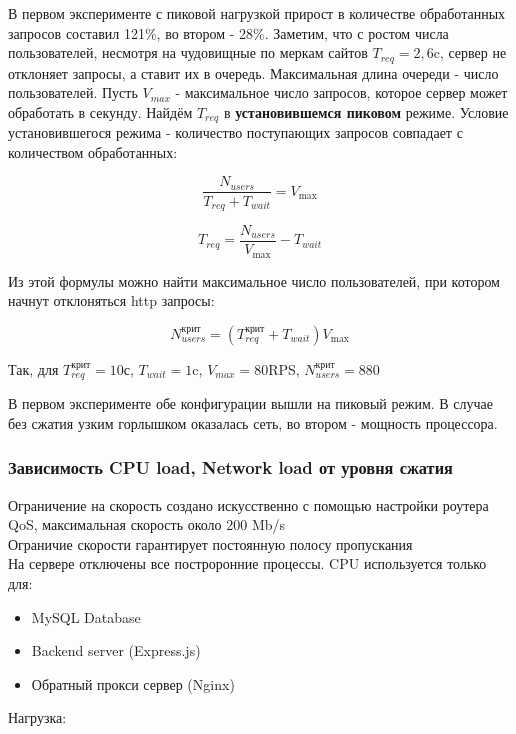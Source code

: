 \documentclass[12pt]{article}
\begin{document}
В первом эксперименте с пиковой нагрузкой прирост в количестве обработанных запросов составил 121\%, во втором - 28\%.
Заметим, что с ростом числа пользователей, несмотря на чудовищные по меркам сайтов $T_{req}=2,6$c,
сервер не отклоняет запросы, а ставит их в очередь. Максимальная длина очереди - число пользователей.
Пусть $V_{max}$ - максимальное число запросов, которое сервер может обработать в секунду.
Найдём $T_{req}$ в \textbf{установившемся пиковом} режиме.
Условие установившегося режима - количество поступающих запросов совпадает с количеством обработанных:

\[
    \frac{N_{users}}{T_{req} + T_{wait}}=V_{\text{max}}
\]

\[
    T_{req} = \frac{N_{users}}{V_{\text{max}}} - T_{wait}
\]

Из этой формулы можно найти максимальное число пользователей, при котором начнут отклоняться http запросы:

\begin{equation}
    N^{\text{крит}}_{users} = (T^{\text{крит}}_{req} + T_{wait}){V_{\text{max}}}
\end{equation}

Так, для $T^{\text{крит}}_{req} = 10$с, $T_{wait}=1$c, $V_{max}=80$RPS, $N^{\text{крит}}_{users}=880$

В первом эксперименте обе конфигурации вышли на пиковый режим. В случае без сжатия узким горлышком оказалась сеть, во втором - мощность процессора.

\subsubsection{Зависимость CPU load, Network load от уровня сжатия}

Ограничение на скорость создано искусственно с помощью настройки роутера QoS, максимальная скорость около 200 Mb/s\\
Ограничие скорости гарантирует постоянную полосу пропускания\\
На сервере отключены все построронние процессы. CPU используется только для:

\begin{itemize}
    \item MySQL Database
    \item Backend server (Express.js)
    \item Обратный прокси сервер (Nginx)
\end{itemize}

Нагрузка:
\end{document}
